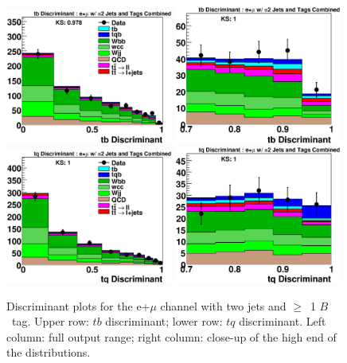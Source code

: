 \begin{figure}[!h!tbp]
\includegraphics[width=0.49\textwidth]
{eps/MatrixElement/output/2jet/All_tb_Discriminant.eps}
\includegraphics[width=0.49\textwidth]
{eps/MatrixElement/output/2jet/All_tb_Discriminant_Zoom.eps}
\includegraphics[width=0.49\textwidth]
{eps/MatrixElement/output/2jet/All_tq_Discriminant.eps}
\includegraphics[width=0.49\textwidth]
{eps/MatrixElement/output/2jet/All_tq_Discriminant_Zoom.eps}
\vspace{-0.1in}
\caption{Discriminant plots for the e+$\mu$ channel with two jets and
$\geq$~1 $B$~tag. Upper row: $tb$ discriminant; lower row: $tq$
discriminant. Left column: full output range; right column: close-up
of the high end of the distributions.}
\label{e21_2j}
\end{figure}

